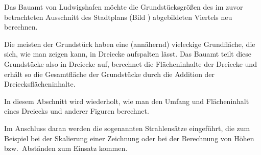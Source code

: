 \begin{MIntro}
Das Bauamt von Ludwigshafen m\"ochte die Grundst\"ucksgr\"o\ss en des im zuvor betrachteten
Ausschnitt des Stadtplans (Bild ) abgebildeten Viertels neu berechnen.


Die meisten der Grundst\"uck haben eine (ann\"ahernd) vieleckige Grundfl\"ache,
die sich, wie man zeigen kann, in Dreiecke aufspalten l\"asst. Das Bauamt teilt diese Grundst\"ucke
also in Dreiecke auf, berechnet die Fl\"acheninhalte der Dreiecke und erh\"alt
so die Gesamtfl\"ache der Grundst\"ucke durch die Addition der Dreiecksfl\"acheninhalte.

In diesem Abschnitt wird wiederholt, wie man den Umfang und Fl\"acheninhalt eines Dreiecks und anderer Figuren berechnet. 

Im Anschluss daran werden die sogenannten Strahlens\"atze eingef\"uhrt,
die zum Beispiel bei der Skalierung einer Zeichnung oder bei der Berechnung
von H\"ohen bzw.\ Abst\"anden zum Einsatz kommen.
\end{MIntro}

\ifttm\relax\else\newpage\fi

